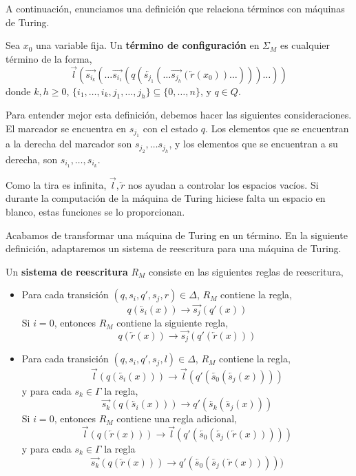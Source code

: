 A continuación, enunciamos una definición que relaciona términos con
máquinas de Turing.

\begin{defi}
  Sea $x_0$ una variable fija. Un \textbf{término de configuración} en
  $\Sigma_M$ es cualquier término de la forma,
\[
  \overrightarrow{l}(\overrightarrow{s_{i_k}}(\dots
  \overrightarrow{s_{i_1}}(q(\overleftarrow{s_{j_1}}(\dots
  \overrightarrow{s_{j_h}}(\overleftarrow{r}(x_0))\dots)))\dots))
\]
donde $k,h \geq 0$, $\{i_1, \dots, i_k, j_1, \dots, j_h \} \subseteq \{0, \dots, n \}$, y $q \in Q$.
\end{defi}

Para entender mejor esta definición, debemos hacer las siguientes
consideraciones. El marcador se encuentra en $s_{j_1}$ con el estado
$q$. Los elementos que se encuentran a la derecha del marcador son
$s_{j_2}, \dots s_{j_h}$, y los elementos que se encuentran a su
derecha, son $s_{i_1}, \dots, s_{i_k}$. 

Como la tira es infinita, $\overrightarrow{l}, \overleftarrow{r}$ nos
ayudan a controlar los espacios vacíos. Si durante la computación de
la máquina de Turing hiciese falta un espacio en blanco, estas
funciones se lo proporcionan.


Acabamos de transformar una máquina de Turing en un término. En la
siguiente definición, adaptaremos un sistema de reescritura para una
máquina de Turing.

\begin{defi}
  Un \textbf{sistema de reescritura} $R_M$ consiste en las siguientes reglas de
  reescritura,
\begin{itemize}
\item Para cada transición $(q, s_i, q', s_j, r) \in \Delta$, $R_M$
  contiene la regla,
\[
  q(\overleftarrow{s_i}(x)) \rightarrow \overrightarrow{s_j}(q'(x))
\]
Si $i=0$, entonces $R_M$ contiene la siguiente regla,
\[
  q(\overleftarrow{r}(x)) \rightarrow
  \overrightarrow{s_j}(q'(\overleftarrow{r}(x)))
\]
\item Para cada transición $(q,s_i,q',s_j,l) \in \Delta$, $R_M$
  contiene la regla,
\[
  \overrightarrow{l}(q(\overleftarrow{s_i}(x))) \rightarrow
  \overrightarrow{l}(q'(\overleftarrow{s_0}(\overleftarrow{s_j}(x))))
\]
y para cada $s_k \in \Gamma$ la regla,
\[
  \overrightarrow{s_k}(q(\overleftarrow{s_i}(x))) \rightarrow
  q'(\overleftarrow{s_k}(\overleftarrow{s_j}(x)))
\]
Si $i=0$, entonces $R_M$ contiene una regla adicional,
\[
  \overrightarrow{l}(q(\overleftarrow{r}(x))) \rightarrow
  \overrightarrow{l}(q'(\overleftarrow{s_0}(\overleftarrow{s_j}(\overleftarrow{r}(x)))))
\]
y para cada $s_k \in \Gamma$ la regla
\[
  \overrightarrow{s_k}(q(\overleftarrow{r}(x))) \rightarrow
  q'(\overleftarrow{s_0}(\overleftarrow{s_j}(\overleftarrow{r}(x)))))
\]
\end{itemize}
\end{defi}

